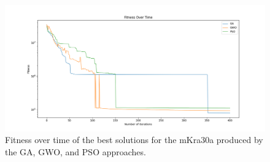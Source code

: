 \begin{figure}[h!]
\centering
\begin{adjustwidth}{-0.45in}{}
\includegraphics[scale=0.5]{./images/chap07-rd/best-fitness-over-time-mKra30a.png}
\end{adjustwidth}
\caption{Fitness over time of the best solutions for the mKra30a produced by the GA, GWO, and PSO approaches.}
\label{graph-approaches-best-solutions-mkra30a}
\end{figure}

